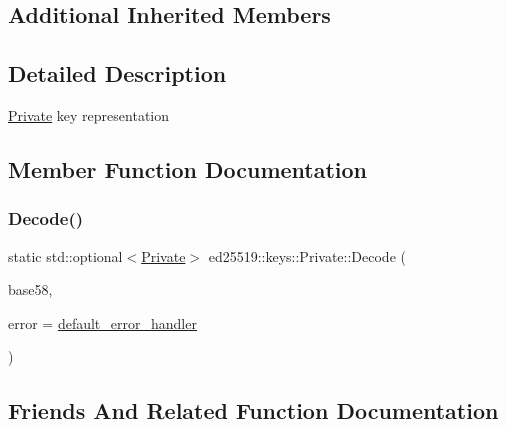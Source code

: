 \subsection*{Additional Inherited Members}


\subsection{Detailed Description}
\mbox{\hyperlink{classed25519_1_1keys_1_1_private}{Private}} key representation 

\subsection{Member Function Documentation}
\mbox{\label{classed25519_1_1keys_1_1_private_adedbd5f3d88c767f5fcf46611585d642}} 
\subsubsection{\texorpdfstring{Decode()}{Decode()}}
{\footnotesize\ttfamily static std\+::optional$<$\mbox{\hyperlink{classed25519_1_1keys_1_1_private}{Private}}$>$ ed25519\+::keys\+::\+Private\+::\+Decode (\begin{DoxyParamCaption}\item[{const std\+::string \&}]{base58,  }\item[{const \mbox{\hyperlink{namespaceed25519_a6ba572942b3c18591fc869d52a6b16e6}{Error\+Handler}} \&}]{error = {\ttfamily \mbox{\hyperlink{namespaceed25519_a7c7bb6ed17541162959c33ed3e3b15fb}{default\+\_\+error\+\_\+handler}}} }\end{DoxyParamCaption})\hspace{0.3cm}{\ttfamily [static]}}



\subsection{Friends And Related Function Documentation}
\mbox{\label{classed25519_1_1keys_1_1_private_ad89670fe663c8c8526b69b1bc6a87c19}} 
